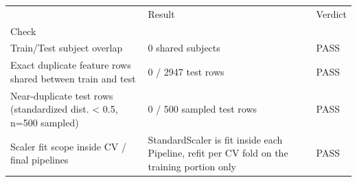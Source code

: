 \begin{tabular}{lll}
\toprule
 & Result & Verdict \\
Check &  &  \\
\midrule
Train/Test subject overlap & 0 shared subjects & PASS \\
Exact duplicate feature rows shared between train and test & 0 / 2947 test rows & PASS \\
Near-duplicate test rows (standardized dist. < 0.5, n=500 sampled) & 0 / 500 sampled test rows & PASS \\
Scaler fit scope inside CV / final pipelines & StandardScaler is fit inside each Pipeline, refit per CV fold on the training portion only & PASS \\
\bottomrule
\end{tabular}
